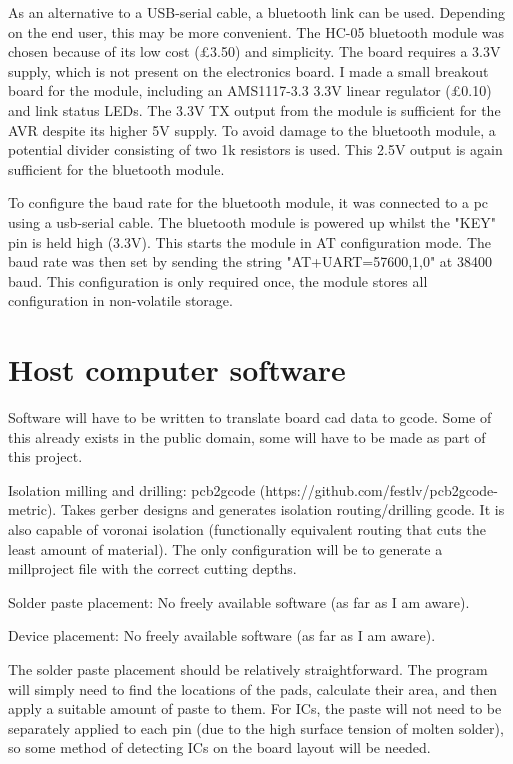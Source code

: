 \documentclass[a4paper,11pt]{article}  %
\begin{document}
As an alternative to a USB-serial cable, a bluetooth link can be used. Depending on the end user, this may be more convenient. The HC-05 bluetooth module was
chosen because of its low cost (£3.50) and simplicity. The board requires a 3.3V supply, which is not present on the electronics board. I made a small
breakout board for the module, including an AMS1117-3.3 3.3V linear regulator (£0.10) and link status LEDs. The 3.3V TX output from the module is sufficient
for the AVR despite its higher 5V supply. To avoid damage to the bluetooth module, a potential divider consisting of two 1k resistors is used. This 2.5V output is
again sufficient for the bluetooth module.

To configure the baud rate for the bluetooth module, it was connected to a pc using a usb-serial cable. The bluetooth module is powered up whilst the "KEY" pin is held high (3.3V).
This starts the module in AT configuration mode. The baud rate was then set by sending the string "AT+UART=57600,1,0" at 38400 baud. This configuration is only required once,
the module stores all configuration in non-volatile storage.

\section{Host computer software}
Software will have to be written to translate board cad data to gcode. Some of this already exists in the public domain, some will have to be made
as part of this project.

Isolation milling and drilling: pcb2gcode (https://github.com/festlv/pcb2gcode-metric). Takes gerber designs and generates isolation routing/drilling
gcode. It is also capable of voronai isolation (functionally equivalent routing that cuts the least amount of material). The only configuration
will be to generate a millproject file with the correct cutting depths.

Solder paste placement: No freely available software (as far as I am aware).

Device placement: No freely available software (as far as I am aware).

The solder paste placement should be relatively straightforward. The program will simply need to find the locations of the pads, calculate their
area, and then apply a suitable amount of paste to them. For ICs, the paste will not need to be separately applied to each pin (due to the high
surface tension of molten solder), so some method of detecting ICs on the board layout will be needed.
\end{document}
